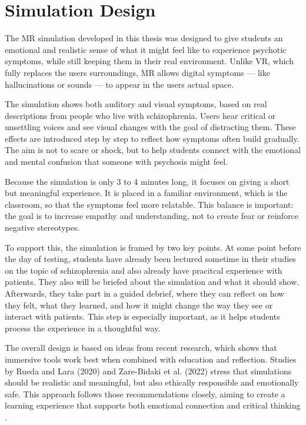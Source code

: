 \section{Simulation Design}

The MR simulation developed in this thesis was designed to give students an emotional and realistic sense of what it might feel like to experience psychotic symptoms, while still keeping them in their real environment. Unlike VR, which fully replaces the users surroundings, MR allows digital symptoms — like hallucinations or sounds — to appear in the users actual space. %

The simulation shows both auditory and visual symptoms, based on real descriptions from people who live with schizophrenia. Users hear critical or unsettling voices and see visual changes with the goal of distracting them. These effects are introduced step by step to reflect how symptoms often build gradually. The aim is not to scare or shock, but to help students connect with the emotional and mental confusion that someone with psychosis might feel.

Because the simulation is only 3 to 4 minutes long, it focuses on giving a short but meaningful experience. It is placed in a familiar environment, which is the classroom, so that the symptoms feel more relatable. This balance is important: the goal is to increase empathy and understanding, not to create fear or reinforce negative stereotypes. %

To support this, the simulation is framed by two key points. At some point before the day of testing, students have already been lectured sometime in their studies on the topic of schizophrenia and also already have pracitcal experience with patients. They also will be briefed about the simulation and what it should show. Afterwards, they take part in a guided debrief, where they can reflect on how they felt, what they learned, and how it might change the way they see or interact with patients. This step is especially important, as it helps students process the experience in a thoughtful way.

The overall design is based on ideas from recent research, which shows that immersive tools work best when combined with education and reflection. Studies by Rueda and Lara (2020) and Zare-Bidaki et al. (2022) stress that simulations should be realistic and meaningful, but also ethically responsible and emotionally safe. This approach follows those recommendations closely, aiming to create a learning experience that supports both emotional connection and critical thinking \cite{Rueda2020,Zare-Bidaki2022}.

